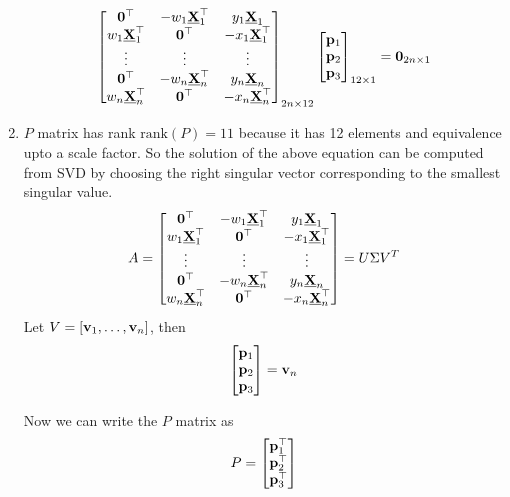 \documentclass{article}
\begin{document}
\begin{enumerate}
       \[
         \begin{bmatrix}
           \mathbf{0}^\top & -w_1 \underline{\mathbf{X}}_1^\top & y_1 \underline{\mathbf{X}}_1 \\
           w_1 \underline{\mathbf{X}}_1^\top & \mathbf{0}^\top  & -x_1 \underline{\mathbf{X}}_1^\top \\
           \vdots & \vdots & \vdots\\
           \mathbf{0}^\top & -w_n \underline{\mathbf{X}}_n^\top & y_n \underline{\mathbf{X}}_n \\
           w_n \underline{\mathbf{X}}_n^\top & \mathbf{0}^\top  & -x_n \underline{\mathbf{X}}_n^\top \\
         \end{bmatrix}_{2n \times 12}
         \begin{bmatrix}
           \mathbf{p}_1 \\
           \mathbf{p}_2 \\
           \mathbf{p}_3
         \end{bmatrix}_{12 \times 1}
         = \mathbf{0}_{2n \times 1}
       \]
   \item $P$ matrix has rank $\text{rank}(P) = 11$ because it has 12 elements
     and equivalence upto a scale factor. So the solution of the above equation
     can be computed from SVD by choosing the right singular vector corresponding
     to the smallest singular value.
     \[
      A = \begin{bmatrix}
        \mathbf{0}^\top & -w_1 \underline{\mathbf{X}}_1^\top & y_1 \underline{\mathbf{X}}_1 \\
        w_1 \underline{\mathbf{X}}_1^\top & \mathbf{0}^\top  & -x_1 \underline{\mathbf{X}}_1^\top \\
        \vdots & \vdots & \vdots\\
        \mathbf{0}^\top & -w_n \underline{\mathbf{X}}_n^\top & y_n \underline{\mathbf{X}}_n \\
        w_n \underline{\mathbf{X}}_n^\top & \mathbf{0}^\top  & -x_n \underline{\mathbf{X}}_n^\top \\
       \end{bmatrix} = U\Sigma V^T
     \]
     Let $V = [\mathbf{v}_1, \dots, \mathbf{v}_n]$, then
     \[
       \begin{bmatrix}
         \mathbf{p}_1 \\
         \mathbf{p}_2 \\
         \mathbf{p}_3
         \end{bmatrix} = \mathbf{v}_n
       \]

       Now we can write the $P$ matrix as
       \[
         P = \begin{bmatrix}
           \mathbf{p}_1^\top \\
           \mathbf{p}_2^\top \\
           \mathbf{p}_3^\top
         \end{bmatrix}
         \]
\end{enumerate}
\newpage
\end{document}
